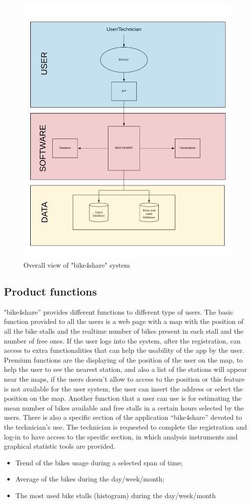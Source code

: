 \documentclass{article}
\begin{document}
\begin{figure}[h]
    \centering
    \includegraphics[width=0.75\linewidth]{image/overallview.PNG}
    \caption{Overall view of "bike4share" system}
    \label{fig:schema}
\end{figure}

\subsection{Product functions}
"bike4share” provides different functions to different type of users. 
The basic function provided to all the users is a web page with a map with the position of all the bike stalls and the realtime number of bikes present in each stall and the number of free ones.
If the user logs into the system, after the registration, can access to extra functionalities that can help the usability of the app by the user. Premium functions are the displaying of the position of the user on the map, to help the user to see the nearest station, and also a list of the stations will appear near the maps, if the users doesn’t allow to access to the position or this feature is not available for the user system, the user can insert the address or select the position on the map. Another function that a user can use is for estimating the mean number of bikes available and free stalls in a certain hours selected by the users. 
There is also a specific section of the application “bike4share” devoted to the technician’s use. The technician is requested to complete the registration and log-in to have access to the specific section, in which analysis instruments and graphical statistic tools are provided. 
\begin{itemize}
    \item Trend of the bikes usage during a selected span of time;
    \item Average of the bikes during the day/week/month;
    \item The most used bike stalls (histogram) during the day/week/month
\end{itemize}
\end{document}
